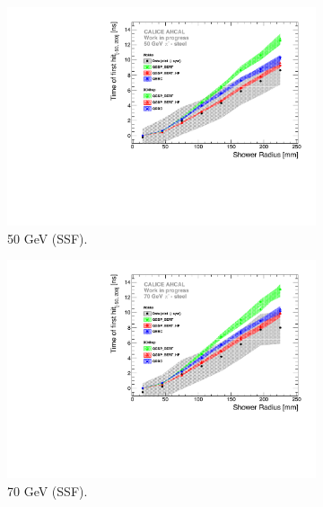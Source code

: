 \begin{figure}[htbp!]
\begin{subfigure}[t]{0.5\textwidth}
		\includegraphics[width=1\textwidth]{chap5/fig_AHCAL_timing/Pions/ComparisonToSim/Time_Radius_50GeV_SSF.pdf}
		\caption{50 GeV (SSF).} \label{fig:Radius_SSF_SimData_50GeV}
	\end{subfigure}
	\hfill
	\begin{subfigure}[t]{0.5\textwidth}
		\centering
		\includegraphics[width=1\textwidth]{chap5/fig_AHCAL_timing/Pions/ComparisonToSim/Time_Radius_70GeV_SSF.pdf}
		\caption{70 GeV (SSF).} \label{fig:Radius_SSF_SimData_70GeV}
	\end{subfigure}
	\hfill
	\begin{subfigure}[t]{0.5\textwidth}
		\centering

\end{subfigure}
\end{figure}
